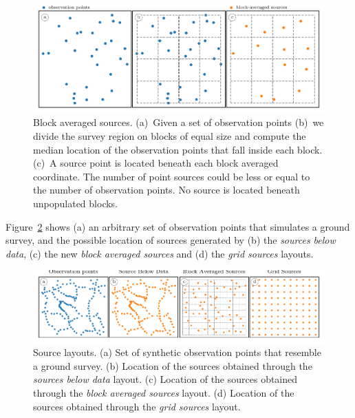 \documentclass[twocolumn]{article}
\begin{document}
\begin{figure}
    \includegraphics[width=\linewidth]{figs/block-averaged-sources-schematics.pdf}
    \caption{
        Block averaged sources.
        (a)~Given a set of observation points
        (b)~we divide the survey region on blocks of equal size and compute the
            median location of the observation points that fall inside each
            block.
        (c)~A source point is located beneath each block averaged coordinate.
            The number of point sources could be less or equal to the number of
            observation points. No source is located beneath unpopulated
            blocks.
    }
    \label{fig:block-averaged-sources}
\end{figure}

Figure~\ref{fig:source-layouts-schematics} shows (a) an arbitrary set of
observation points that simulates a ground survey, and the possible location of
sources generated by (b) the \emph{sources below data}, (c) the new \emph{block
averaged sources} and (d) the \emph{grid sources} layouts.

\begin{figure}
    \includegraphics[width=\linewidth]{figs/source-layouts-schematics.pdf}
    \caption{
        Source layouts.
        (a) Set of \SourceLayoutsSchematicsObservations{} synthetic observation
            points that resemble a ground survey.
        (b) Location of the \SourceLayoutsSchematicsSourceBelowData{} sources
            obtained through the \emph{sources below data} layout.
        (c) Location of the \SourceLayoutsSchematicsBlockAveragedSources{}
            sources obtained through the \emph{block averaged sources} layout.
        (d) Location of the \SourceLayoutsSchematicsGridSources{} sources
            obtained through the \emph{grid sources} layout.
    }
    \label{fig:source-layouts-schematics}
\end{figure}
\end{document}

